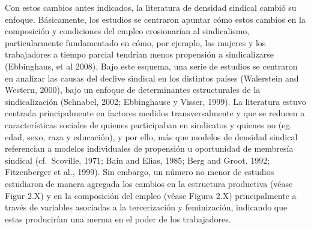 \documentclass[
]{book}
\begin{document}
Con estos cambios antes indicados, la literatura de densidad sindical cambió su enfoque. Básicamente, los estudios se centraron apuntar cómo estos cambios en la composición y condiciones del empleo erosionarían al sindicalismo, particularmente fundamentado en cómo, por ejemplo, las mujeres y los trabajadores a tiempo parcial tendrían menos propensión a sindicalizarse (Ebbinghaus, et al 2008). Bajo este esquema, una serie de estudios se centraron en analizar las causas del declive sindical en los distintos países (Walerstein and Western, 2000), bajo un enfoque de determinantes estructurales de la sindicalización (Schnabel, 2002; Ebbinghause y Visser, 1999). La literatura estuvo centrada principalmente en factores medidos transversalmente y que se reducen a características sociales de quienes participaban en sindicatos y quienes no (eg. edad, sexo, raza y educación), y por ello, más que modelos de densidad sindical referencian a modelos individuales de propensión u oportunidad de membresía sindical (cf.~Scoville, 1971; Bain and Elias, 1985; Berg and Groot, 1992; Fitzenberger et al., 1999). Sin embargo, un número no menor de estudios estudiaron de manera agregada los cambios en la estructura productiva (véase Figur 2.X) y en la composición del empleo (véase Figura 2.X) principalmente a través de variables asociadas a la tercerización y feminización, indicando que estas producirían una merma en el poder de los trabajadores.
\end{document}
